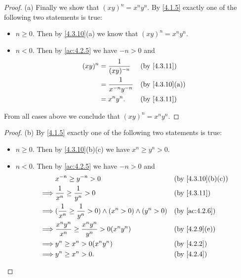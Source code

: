 \begin{proof}{(a)}
  Finally we show that \((xy)^n = x^n y^n\).
  By \cref{4.1.5} exactly one of the following two statements is true:
  \begin{itemize}
    \item \(n \geq 0\).
          Then by \cref{4.3.10}(a) we know that \((xy)^n = x^n y^n\).
    \item \(n < 0\).
          Then by \cref{ac:4.2.5} we have \(-n > 0\) and
          \begin{align*}
            (xy)^n & = \dfrac{1}{(xy)^{-n}}     &  & \text{(by \cref{4.3.11})}    \\
                   & = \dfrac{1}{x^{-n} y^{-n}} &  & \text{(by \cref{4.3.10}(a))} \\
                   & = x^n y^n.                 &  & \text{(by \cref{4.3.11})}
          \end{align*}
  \end{itemize}
  From all cases above we conclude that \((xy)^n = x^n y^n\).
\end{proof}

\begin{proof}{(b)}
  By \cref{4.1.5} exactly one of the following two statements is true:
  \begin{itemize}
    \item \(n \geq 0\).
          Then by \cref{4.3.10}(b)(c) we have \(x^n \geq y^n > 0\).
    \item \(n < 0\).
          Then by \cref{ac:4.2.5} we have \(-n > 0\) and
          \begin{align*}
                     & x^{-n} \geq y^{-n} > 0                                                   &  & \text{(by \cref{4.3.10}(b)(c))} \\
            \implies & \dfrac{1}{x^n} \geq \dfrac{1}{y^n} > 0                                   &  & \text{(by \cref{4.3.11})}       \\
            \implies & (\dfrac{1}{x^n} \geq \dfrac{1}{y^n} > 0) \land (x^n > 0) \land (y^n > 0) &  & \text{(by \cref{ac:4.2.6})}     \\
            \implies & \dfrac{x^n y^n}{x^n} \geq \dfrac{x^n y^n}{y^n} > 0(x^n y^n)              &  & \text{(by \cref{4.2.9}(e))}     \\
            \implies & y^n \geq x^n > 0(x^n y^n)                                                &  & \text{(by \cref{4.2.2})}        \\
            \implies & y^n \geq x^n > 0.                                                        &  & \text{(by \cref{4.2.4})}
          \end{align*}
  \end{itemize}
\end{proof}

